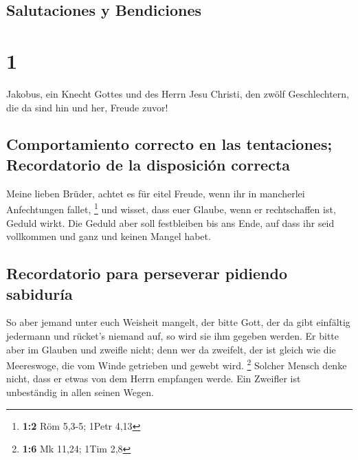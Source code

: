 \hypertarget{salutaciones-y-bendiciones}{%
\subsection{Salutaciones y
Bendiciones}\label{salutaciones-y-bendiciones}}

\hypertarget{section}{%
\section{1}\label{section}}

 Jakobus, ein Knecht Gottes und des Herrn Jesu Christi,
den zwölf Geschlechtern, die da sind hin und her, Freude zuvor!

\hypertarget{comportamiento-correcto-en-las-tentaciones-recordatorio-de-la-disposiciuxf3n-correcta}{%
\subsection{Comportamiento correcto en las tentaciones; Recordatorio de
la disposición
correcta}\label{comportamiento-correcto-en-las-tentaciones-recordatorio-de-la-disposiciuxf3n-correcta}}

 Meine lieben Brüder, achtet es für eitel Freude, wenn ihr
in mancherlei Anfechtungen fallet, \footnote{\textbf{1:2} Röm 5,3-5;
  1Petr 4,13}  und wisset, dass euer Glaube, wenn er
rechtschaffen ist, Geduld wirkt.  Die Geduld aber soll
festbleiben bis ans Ende, auf dass ihr seid vollkommen und ganz und
keinen Mangel habet.

\hypertarget{recordatorio-para-perseverar-pidiendo-sabiduruxeda}{%
\subsection{Recordatorio para perseverar pidiendo
sabiduría}\label{recordatorio-para-perseverar-pidiendo-sabiduruxeda}}

 So aber jemand unter euch Weisheit mangelt, der bitte
Gott, der da gibt einfältig jedermann und rücket's niemand auf, so wird
sie ihm gegeben werden.  Er bitte aber im Glauben und
zweifle nicht; denn wer da zweifelt, der ist gleich wie die Meereswoge,
die vom Winde getrieben und gewebt wird. \footnote{\textbf{1:6} Mk
  11,24; 1Tim 2,8}  Solcher Mensch denke nicht, dass er
etwas von dem Herrn empfangen werde.  Ein Zweifler ist
unbeständig in allen seinen Wegen.


